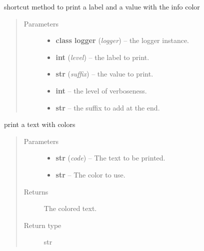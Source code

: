 \documentclass[a4paper,10pt,english]{sphinxmanual}
\begin{document}
\begin{fulllineitems}
\label{commands/apidoc/src:src.printcolors.print_value}
shortcut method to print a label and a value with the info color
\begin{quote}\begin{description}
\item[{Parameters}] \leavevmode\begin{itemize}
\item {} 
\textbf{class logger} (\emph{logger}) -- the logger instance.

\item {} 
\textbf{int} (\emph{level}) -- the label to print.

\item {} 
\textbf{str} (\emph{suffix}) -- the value to print.

\item {} 
\textbf{int} -- the level of verboseness.

\item {} 
\textbf{str} -- the suffix to add at the end.

\end{itemize}

\end{description}\end{quote}

\end{fulllineitems}


\begin{fulllineitems}
\label{commands/apidoc/src:src.printcolors.printc}
print a text with colors
\begin{quote}\begin{description}
\item[{Parameters}] \leavevmode\begin{itemize}
\item {} 
\textbf{str} (\emph{code}) -- The text to be printed.

\item {} 
\textbf{str} -- The color to use.

\end{itemize}

\item[{Returns}] \leavevmode
The colored text.

\item[{Return type}] \leavevmode
str

\end{description}\end{quote}

\end{fulllineitems}
\end{document}
